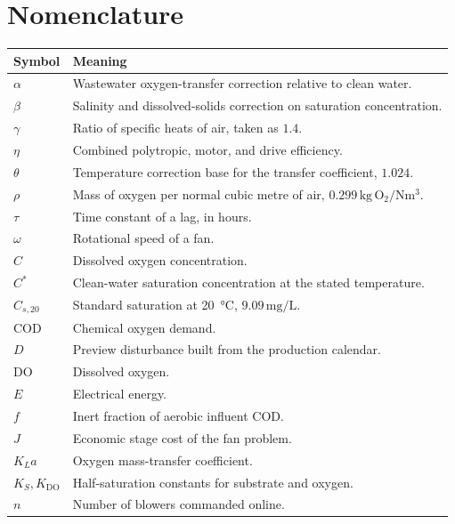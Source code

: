 \documentclass[12pt,a4paper]{report}
\begin{document}
\tableofcontents
\listoffigures
\listoftables

\chapter*{Nomenclature}

{\footnotesize
{}
\renewcommand{\arraystretch}{1.05}
\begin{tabular}{@{}>{\raggedright\arraybackslash}p{2.5cm}p{11.4cm}@{}}
\toprule
Symbol & Meaning \\
\midrule
$\alpha$ & Wastewater oxygen-transfer correction relative to clean water. \\
$\beta$ & Salinity and dissolved-solids correction on saturation concentration. \\
$\gamma$ & Ratio of specific heats of air, taken as $1.4$. \\
$\eta$ & Combined polytropic, motor, and drive efficiency. \\
$\theta$ & Temperature correction base for the transfer coefficient, $1.024$. \\
$\rho$ & Mass of oxygen per normal cubic metre of air, $0.299\,\mathrm{kg\,O_2/Nm^3}$. \\
$\tau$ & Time constant of a lag, in hours. \\
$\omega$ & Rotational speed of a fan. \\
$C$ & Dissolved oxygen concentration. \\
$C^{*}$ & Clean-water saturation concentration at the stated temperature. \\
$C_{s,20}$ & Standard saturation at \SI{20}{\celsius}, $9.09\,\mathrm{mg/L}$. \\
$\mathrm{COD}$ & Chemical oxygen demand. \\
$D$ & Preview disturbance built from the production calendar. \\
$\mathrm{DO}$ & Dissolved oxygen. \\
$E$ & Electrical energy. \\
$f$ & Inert fraction of aerobic influent $\mathrm{COD}$. \\
$J$ & Economic stage cost of the fan problem. \\
$K_La$ & Oxygen mass-transfer coefficient. \\
$K_S,K_{\mathrm{DO}}$ & Half-saturation constants for substrate and oxygen. \\
$n$ & Number of blowers commanded online. \\

\end{tabular}}
\end{document}
